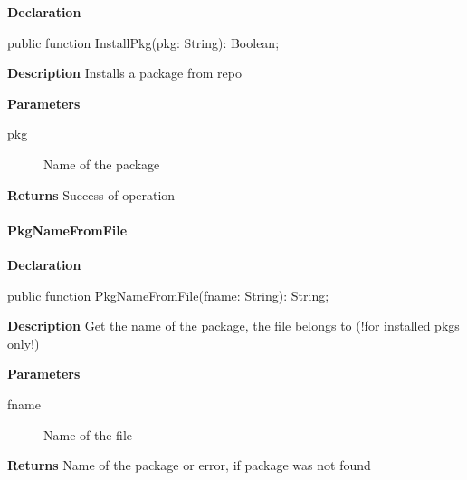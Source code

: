 \documentclass{report}
\newif\ifpdf
\begin{document}
\label{packagekit.TPackageKit-InstallPkg}
\begin{list}{}{
\setlength{\itemindent}{0cm}
\setlength{\listparindent}{0cm}
\setlength{\leftmargin}{\evensidemargin}
\addtolength{\leftmargin}{\tmplength}
\settowidth{\labelsep}{X}
\addtolength{\leftmargin}{\labelsep}
\setlength{\labelwidth}{\tmplength}
}
\item[\textbf{Declaration}\hfill]
\ifpdf
\begin{flushleft}
\fi
\begin{ttfamily}
public function InstallPkg(pkg: String): Boolean;\end{ttfamily}

\ifpdf
\end{flushleft}
\fi

\par
\item[\textbf{Description}]
Installs a package from repo  \par
\item[\textbf{Parameters}]
\begin{description}
\item[pkg] Name of the package
\end{description}
\item[\textbf{Returns}]Success of operation


\end{list}
\paragraph*{PkgNameFromFile}\hspace*{\fill}

\label{packagekit.TPackageKit-PkgNameFromFile}
\begin{list}{}{
\setlength{\itemindent}{0cm}
\setlength{\listparindent}{0cm}
\setlength{\leftmargin}{\evensidemargin}
\addtolength{\leftmargin}{\tmplength}
\settowidth{\labelsep}{X}
\addtolength{\leftmargin}{\labelsep}
\setlength{\labelwidth}{\tmplength}
}
\item[\textbf{Declaration}\hfill]
\ifpdf
\begin{flushleft}
\fi
\begin{ttfamily}
public function PkgNameFromFile(fname: String): String;\end{ttfamily}

\ifpdf
\end{flushleft}
\fi

\par
\item[\textbf{Description}]
Get the name of the package, the file belongs to (!for installed pkgs only!)  \par
\item[\textbf{Parameters}]
\begin{description}
\item[fname] Name of the file
\end{description}
\item[\textbf{Returns}]Name of the package or error, if package was not found


\end{list}
\end{document}
